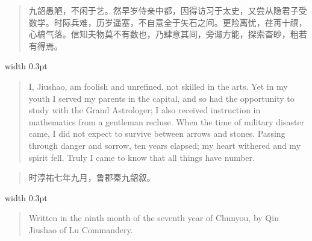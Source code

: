 \documentclass[10pt,a4paper]{article}
\newenvironment{prefacecn}{\begin{quote}\color{prefacecolor}\small}{\end{quote}}
\newenvironment{prefaceen}{\begin{quote}\color{prefacecolor}\small}{\end{quote}}
\begin{document}
\noindent\begin{minipage}[t]{0.47\textwidth}
\begin{flushleft}
\begin{prefacecn}
九韶愚陋，不闲于艺。然早岁侍亲中都，因得访习于太史，又尝从隐君子受数学。时际兵难，历岁遥塞，不自意全于矢石之间。更险离忧，荏苒十禩，心槁气落。信知夫物莫不有数也，乃肆意其间，旁诹方能，探索杳眇，粗若有得焉。
\end{prefacecn}
\end{flushleft}
\end{minipage}%
\hfill\vrule width 0.3pt\hfill%
\begin{minipage}[t]{0.47\textwidth}
\begin{flushleft}
\begin{prefaceen}
I, Jiushao, am foolish and unrefined, not skilled in the arts. Yet in my youth I served my parents in the capital, and so had the opportunity to study with the Grand Astrologer; I also received instruction in mathematics from a gentleman recluse. When the time of military disaster came, I did not expect to survive between arrows and stones. Passing through danger and sorrow, ten years elapsed; my heart withered and my spirit fell. Truly I came to know that all things have number.
\end{prefaceen}
\end{flushleft}
\end{minipage}

\vspace{0.3em}

\noindent\begin{minipage}[t]{0.47\textwidth}
\begin{flushleft}
\begin{prefacecn}
时淳祐七年九月，鲁郡秦九韶叙。
\end{prefacecn}
\end{flushleft}
\end{minipage}%
\hfill\vrule width 0.3pt\hfill%
\begin{minipage}[t]{0.47\textwidth}
\begin{flushleft}
\begin{prefaceen}
Written in the ninth month of the seventh year of Chunyou, by Qin Jiushao of Lu Commandery.
\end{prefaceen}
\end{flushleft}
\end{minipage}

\newpage

\end{document}
